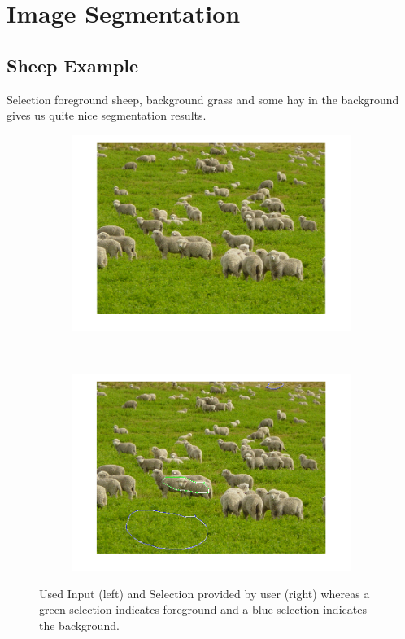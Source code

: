 \documentclass{paper}
\begin{document}
\section{Image Segmentation}


\subsection{Sheep Example}

Selection foreground sheep, background grass and some hay in the background gives us quite nice segmentation results.

\begin{figure}[H]
    \centering
    \begin{subfigure}{0.45\textwidth}
        \includegraphics[width=\textwidth]{../../outputs/p4/image_segmentation/sheeps/input}
    \end{subfigure}
    ~
        \begin{subfigure}{0.45\textwidth}
        \includegraphics[width=\textwidth]{../../outputs/p4/image_segmentation/sheeps/selection}
    \end{subfigure}
    
    \caption{Used Input (left) and Selection provided by user (right) whereas a green selection indicates foreground and a blue selection indicates the background.}
    \label{fig:segmentation_sheeps_input_selection}       
\end{figure}
\end{document}
